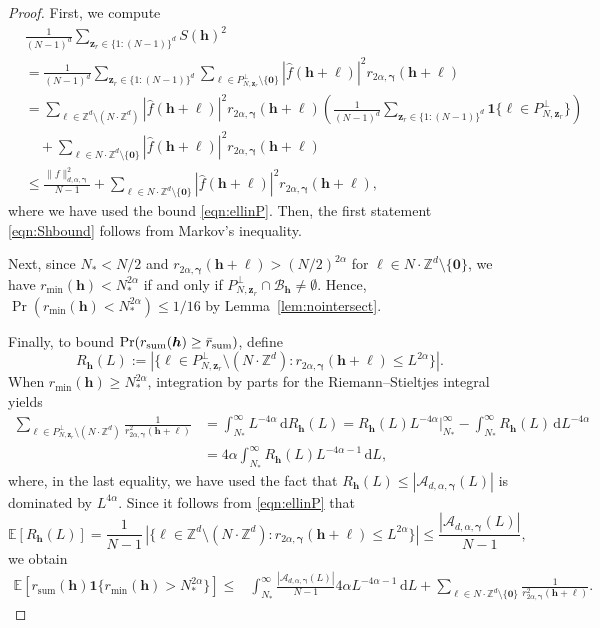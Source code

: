 \documentclass[a4paper,11pt]{article}
\newcommand{\rd}{\, \mathrm{d}}
\newcommand{\bszero}{\boldsymbol{0}}
\newcommand{\bsh}{\boldsymbol{h}}
\newcommand{\bsl}{\boldsymbol{\ell}}
\newcommand{\bsz}{\boldsymbol{z}}
\newcommand{\bsgamma}{\boldsymbol{\gamma}}
\newcommand{\ZZ}{\mathbb{Z}}
\newcommand{\Acal}{\mathcal{A}}
\newcommand{\e}{\mathbb{E}}
\newcommand{\bsone}{\boldsymbol{1}}
\begin{document}
\begin{proof}
First, we compute
\begin{align*}
   & \frac{1}{(N-1)^d}\sum_{\bsz_r\in \{1{:}(N-1)\}^d}S(\bsh)^2 \\
   & =\frac{1}{(N-1)^d}\sum_{\bsz_r\in \{1{:}(N-1)\}^d}\sum_{\bsl\in P_{N,\boldsymbol{z}_r}^\perp\setminus \{\bszero\}}|\widehat{f}(\bsh+\bsl)|^2 r_{2\alpha,\bsgamma}(\bsh+\bsl)\\
   & = \sum_{\bsl \in \ZZ^d\setminus (N\cdot \ZZ^d)}|\widehat{f}(\bsh+\bsl)|^2r_{2\alpha, \bsgamma}(\bsh+\bsl)\left(\frac{1}{(N-1)^d}\sum_{\bsz_r\in \{1{:}(N-1)\}^d}\bsone\{\bsl \in P_{N,\boldsymbol{z}_r}^\perp\}\right) \\
   & \quad +\sum_{\bsl \in N\cdot \ZZ^d\setminus \{\bszero\} }|\widehat{f}(\bsh+\bsl)|^2 r_{2\alpha, \bsgamma}(\bsh+\bsl) \\
   & \le \frac{\|f\|^2_{d,\alpha,\bsgamma}}{N-1 }+\sum_{\bsl \in N\cdot \ZZ^d\setminus \{\bszero\} }|\widehat{f}(\bsh+\bsl)|^2r_{2\alpha, \bsgamma}(\bsh+\bsl),
\end{align*}
where we have used the bound \eqref{eqn:ellinP}. Then, the first statement \eqref{eqn:Shbound} follows from Markov's inequality.

Next, since $N_* < N/2$ and $r_{2\alpha,\bsgamma}(\bsh+\bsl) > (N/2)^{2\alpha}$ for 
$\bsl \in N\cdot \ZZ^d\setminus \{\bszero\}$, we have 
$r_{\min}(\bsh) < N_*^{2\alpha}$ if and only if 
$P_{N,\boldsymbol{z}_r}^\perp \cap \mathcal{B}_{\bsh} \neq \emptyset$. 
Hence, $\Pr(r_{\min}(\bsh) < N_*^{2\alpha}) \leq 1/16$ by Lemma~\ref{lem:nointersect}.

Finally, to bound $\Pr(r_{\mathrm{sum}}(\bsh) \geq \Bar{r}_{\mathrm{sum}})$, define 
\[
R_{\bsh}(L)
:= |\{\bsl \in P_{N,\boldsymbol{z}_r}^\perp\setminus (N\cdot \ZZ^d):
      r_{2\alpha,\bsgamma}(\bsh+\bsl) \leq L^{2\alpha}\}|.
\]
When $r_{\min}(\bsh) \geq N_*^{2\alpha}$, 
integration by parts for the Riemann--Stieltjes integral yields
    \begin{align*}
    \sum_{\bsl\in P_{N,\boldsymbol{z}_r}^\perp\setminus (N\cdot \ZZ^d) } \frac{1}{r^2_{2\alpha, \bsgamma}(\bsh+\bsl)}
    & = \int_{N_*}^\infty L^{-4\alpha}\rd R_{\bsh}(L) = R_{\bsh}(L) L^{-4\alpha}\bigg\vert_{N_*}^\infty -
    \int_{N_*}^\infty R_{\bsh}(L) \rd L^{-4\alpha} \\
    & = 4\alpha \int_{N_*}^\infty R_{\bsh}(L) L^{-4\alpha-1} \rd L,
    \end{align*}
    where, in the last equality, we have used the fact that $R_{\bsh}(L)\leq |\Acal_{d,\alpha,\bsgamma}(L)|$ is dominated by $L^{4\alpha}$. 
    Since it follows from \eqref{eqn:ellinP} that
    \[
        \e[R_{\bsh}(L)] = \frac{1}{N-1}\, |\{\bsl \in \ZZ^d\setminus (N\cdot \ZZ^d): r_{2\alpha,\bsgamma}(\bsh+\bsl)\leq L^{2\alpha}\}| \leq \frac{|\Acal_{d,\alpha,\bsgamma}(L)|}{N-1},
    \]
    we obtain
    \begin{align*}
        \e[r_{\mathrm{sum}}(\bsh)\bsone\{r_{\min}(\bsh)> N^{2\alpha}_*\}]\leq &\int_{N_*}^\infty \frac{|\Acal_{d,\alpha,\bsgamma}(L)|}{N-1} 4\alpha L^{-4\alpha-1} \rd L+\sum_{\bsl\in N\cdot \ZZ^d\setminus\{\bszero\}}\frac{1}{r^2_{2\alpha, \bsgamma}(\bsh+\bsl)}. 
    \end{align*}
    

\end{proof}
\end{document}
